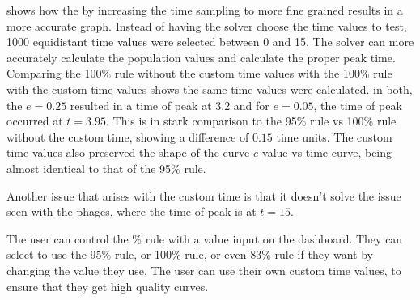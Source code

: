  shows how the by increasing the time sampling to more fine grained results in a more accurate graph. 
Instead of having the solver choose the time values to test, 1000 equidistant time values were selected between 0 and 15. 
The solver can more accurately calculate the population values and calculate the proper peak time. 
Comparing the 100\% rule without the custom time values with the 100\% rule with the custom time values shows the same time values were calculated. 
in both, the $e=0.25$ resulted in a time of peak at 3.2 and for $e=0.05$, the time of peak occurred at $t=3.95$. 
This is in stark comparison to the 95\% rule vs 100\% rule without the custom time, showing a difference of $0.15$ time units. 
The custom time values also preserved the shape of the curve $e$-value vs time curve, being almost identical to that of the 95\% rule.

Another issue that arises with the custom time is that it doesn't solve the issue seen with the phages, where the time of peak is at $t=15$. 

The user can control the \% rule with a value input on the dashboard. 
They can select to use the 95\% rule, or 100\% rule, or even 83\% rule if they want by changing the value they use. 
The user can use their own custom time values, to ensure that they get high quality curves. 

